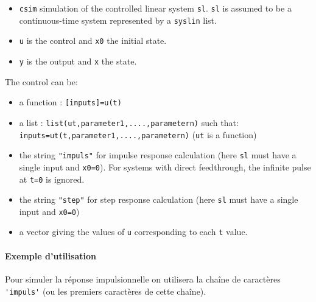 \begin{doc}
\begin{itemize}
\begin{itemize}
        \item \verb?csim? simulation of the controlled linear system \verb?sl?.
              \verb?sl? is assumed to be a continuous-time system represented 
              by a \verb?syslin? list.
        \item \verb?u?  is the control and \verb?x0? the initial state.
        \item \verb?y?  is the output and \verb?x? the state.
    \end{itemize}
    The control can be:
    \begin{itemize}
        \item a function : \verb?[inputs]=u(t)?
        \item a list : \verb?list(ut,parameter1,....,parametern)? such that:
              \verb?inputs=ut(t,parameter1,....,parametern)? 
    (\verb?ut? is a function)
        \item the string \verb?"impuls"? for impulse response calculation 
              (here \verb?sl? must have a single input and \verb?x0=0?). 
              For systems with direct feedthrough, the infinite pulse at 
              \verb?t=0? is ignored.
        \item the string \verb?"step"? for step response calculation (here 
              \verb?sl? must have a single input and \verb?x0=0?)
        \item a vector giving the values of \verb?u? corresponding to each 
              \verb?t? value.
    \end{itemize}
\end{itemize}
\end{doc}
\paragraph{Exemple d'utilisation}
Pour simuler la réponse impulsionnelle on utilisera la chaîne de caractères 
\verb?'impuls'? (ou les premiers caractères de cette chaîne). 

